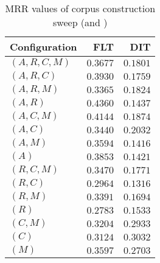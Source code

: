 
\begin{table}
\begin{spacing}{1.2}
\centering
\caption{MRR values of \pig corpus construction sweep (\cone and \ctwo)}
\label{table:pig_corpus_sweep}
\vspace{0.2em}
\begin{tabular}{lrr}
\toprule
Configuration &           FLT &           DIT \\
\midrule
  $(A,R,C,M)$ &      $0.3677$ &      $0.1801$ \\
    $(A,R,C)$ &      $0.3930$ &      $0.1759$ \\
    $(A,R,M)$ &      $0.3365$ &      $0.1824$ \\
      $(A,R)$ & $\bm{0.4360}$ &      $0.1437$ \\
    $(A,C,M)$ &      $0.4144$ &      $0.1874$ \\
      $(A,C)$ &      $0.3440$ &      $0.2032$ \\
      $(A,M)$ &      $0.3594$ &      $0.1416$ \\
        $(A)$ &      $0.3853$ &      $0.1421$ \\
    $(R,C,M)$ &      $0.3470$ &      $0.1771$ \\
      $(R,C)$ &      $0.2964$ &      $0.1316$ \\
      $(R,M)$ &      $0.3391$ &      $0.1694$ \\
        $(R)$ &      $0.2783$ &      $0.1533$ \\
      $(C,M)$ &      $0.3204$ &      $0.2933$ \\
        $(C)$ &      $0.3124$ & $\bm{0.3032}$ \\
        $(M)$ &      $0.3597$ &      $0.2703$ \\
\bottomrule
\end{tabular}

\end{spacing}
\end{table}
